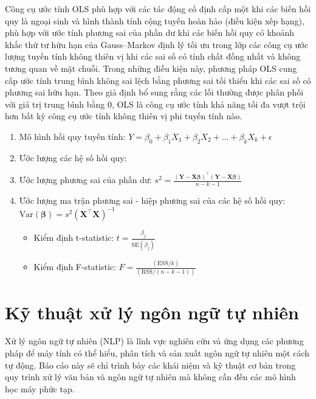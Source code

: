 Công cụ ước tính OLS phù hợp với các tác động cố định cấp một khi các biến hồi quy là ngoại sinh và hình thành tính cộng tuyến hoàn hảo (điều kiện xếp hạng), phù hợp với ước tính phương sai của phần dư khi các biến hồi quy có khoảnh khắc thứ tư hữu hạn của Gauss–Markov định lý tối ưu trong lớp các công cụ ước lượng tuyến tính không thiên vị khi các sai số có tính chất đồng nhất và không tương quan về mặt chuỗi. Trong những điều kiện này, phương pháp OLS cung cấp ước tính trung bình không sai lệch bằng phương sai tối thiểu khi các sai số có phương sai hữu hạn. Theo giả định bổ sung rằng các lỗi thường được phân phối với giá trị trung bình bằng 0, OLS là công cụ ước tính khả năng tối đa vượt trội hơn bất kỳ công cụ ước tính không thiên vị phi tuyến tính nào.
\begin{enumerate}
    \item Mô hình hồi quy tuyến tính:
    $Y = \beta_0 + \beta_1 X_1 + \beta_2 X_2 + \dots + \beta_k X_k +\epsilon$

    \item Ước lượng các hệ số hồi quy:

    \item Ước lượng phương sai của phần dư:
    $s^2 = \frac{(\mathbf{Y} - \mathbf{X}\boldsymbol{\beta})^\top (\mathbf{Y} - \mathbf{X}\boldsymbol{\beta})}{n - k - 1}$

    \item Ước lượng ma trận phương sai - hiệp phương sai của các hệ số hồi quy:
    $\text{Var}(\boldsymbol{\beta}) = s^2 (\mathbf{X}^\top \mathbf{X})^{-1}$

    \begin{itemize}
        \item Kiểm định t-statistic:
        $t = \frac{\beta_j}{\text{SE}(\beta_j)}$
    
        \item Kiểm định F-statistic:
        $F = \frac{(\text{ESS} / k)}{(\text{RSS} / (n - k - 1))}$
    \end{itemize}
    
\end{enumerate}
\section{Kỹ thuật xử lý ngôn ngữ tự nhiên}

Xử lý ngôn ngữ tự nhiên (NLP) là lĩnh vực nghiên cứu và ứng dụng các phương pháp để máy tính có thể hiểu, phân tích và sản xuất ngôn ngữ tự nhiên một cách tự động. Báo cáo này sẽ chỉ trình bày các khái niệm và kỹ thuật cơ bản trong quy trình xử lý văn bản và ngôn ngữ tự nhiên mà không cần đến các mô hình học máy phức tạp.

